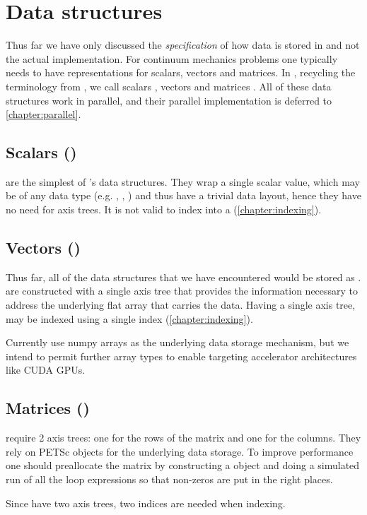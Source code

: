 \documentclass[thesis]{subfiles}
\begin{document}
\section{Data structures}

Thus far we have only discussed the \textit{specification} of how data is stored in  and not the actual implementation.
For continuum mechanics problems one typically needs to have representations for scalars, vectors and matrices.
In , recycling the terminology from , we call scalars , vectors  and matrices .
All of these data structures work in parallel, and their parallel implementation is deferred to \cref{chapter:parallel}.


\subsection{Scalars ()}

 are the simplest of 's data structures.
They wrap a single scalar value, which may be of any data type (e.g. , , ) and thus have a trivial data layout, hence they have no need for axis trees.
It is not valid to index into a  (\cref{chapter:indexing}).

\subsection{Vectors ()}

Thus far, all of the data structures that we have encountered would be stored as .
 are constructed with a single axis tree that provides the information necessary to address the underlying flat array that carries the data.
Having a single axis tree,  may be indexed using a single index (\cref{chapter:indexing}).

Currently  use numpy arrays as the underlying data storage mechanism, but we intend to permit further array types to enable targeting accelerator architectures like CUDA GPUs.

\subsection{Matrices ()}

 require 2 axis trees: one for the rows of the matrix and one for the columns.
They rely on PETSc  objects for the underlying data storage.
To improve performance one should preallocate the matrix by constructing a  object and doing a simulated run of all the loop expressions so that non-zeros are put in the right places.

Since  have two axis trees, two indices are needed when indexing.
\end{document}
